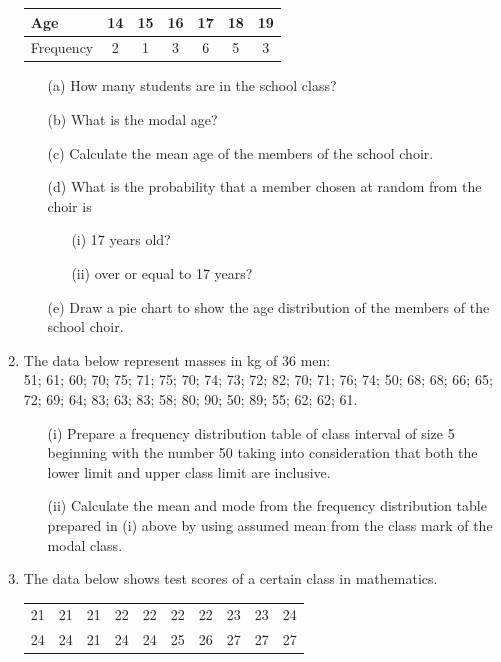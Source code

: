 \begin{enumerate}
	\begin{tabular}{|l|c|c|c|c|c|c|} \hline
	Age&14&15&16&17&18&19 \\ \hline
	Frequency&2&1&3&6&5&3 \\ \hline	
	\end{tabular}
	
	\begin{itemize}
	\item[(a)] How many students are in the school class?
	\item[(b)] What is the modal age?
	\item[(c)] Calculate the mean age of the members of the school choir.
	\item[(d)] What is the probability that a member chosen at random from the choir is
		\begin{itemize}
		\item[(i)] 17 years old?
		\item[(ii)] over or equal to 17 years?
		\end{itemize}
	\item[(e)] Draw a pie chart to show the age distribution of the members of the school choir.
	\end{itemize}
	
	\item The data below represent masses in kg of 36 men:\\
	51; 61; 60; 70; 75; 71; 75; 70; 74; 73; 72; 82; 70; 71; 76; 74; 50; 68; 68; 66; 65; 72; 69; 64; 83; 63; 83; 58; 80; 90; 50; 89; 55; 62; 62; 61.
	\begin{itemize}
	\item[(i)] Prepare a frequency distribution table of class interval of size 5 beginning with the number 50 taking into consideration that both the lower limit and upper class limit are inclusive.
	\item[(ii)] Calculate the mean and mode from the frequency distribution table prepared in (i) above by using assumed mean from the class mark of the modal class.
	\end{itemize}
	
	\item The data below shows test scores of a certain class in mathematics.
	
	\begin{tabular}{cccccccccc}
	21&21&21&22&22&22&22&23&23&24 \\
	24&24&21&24&24&25&26&27&27&27 \\
	\end{tabular}
	

\end{enumerate}
